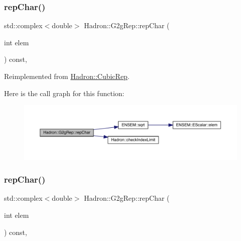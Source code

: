 \subsubsection{\texorpdfstring{repChar()}{repChar()}\hspace{0.1cm}{\footnotesize\ttfamily [2/3]}}
{\footnotesize\ttfamily std\+::complex$<$double$>$ Hadron\+::\+G2g\+Rep\+::rep\+Char (\begin{DoxyParamCaption}\item[{int}]{elem }\end{DoxyParamCaption}) const\hspace{0.3cm}{\ttfamily [inline]}, {\ttfamily [virtual]}}



Reimplemented from \mbox{\hyperlink{structHadron_1_1CubicRep_af45227106e8e715e84b0af69cd3b36f8}{Hadron\+::\+Cubic\+Rep}}.

Here is the call graph for this function\+:
\nopagebreak
\begin{figure}[H]
\begin{center}
\leavevmode
\includegraphics[width=350pt]{d9/d3e/structHadron_1_1G2gRep_ab31419c7383dac18c56c70f3ca7220a9_cgraph}
\end{center}
\end{figure}
\mbox{\label{structHadron_1_1G2gRep_ab31419c7383dac18c56c70f3ca7220a9}} 
\subsubsection{\texorpdfstring{repChar()}{repChar()}\hspace{0.1cm}{\footnotesize\ttfamily [3/3]}}
{\footnotesize\ttfamily std\+::complex$<$double$>$ Hadron\+::\+G2g\+Rep\+::rep\+Char (\begin{DoxyParamCaption}\item[{int}]{elem }\end{DoxyParamCaption}) const\hspace{0.3cm}{\ttfamily [inline]}, {\ttfamily [virtual]}}



